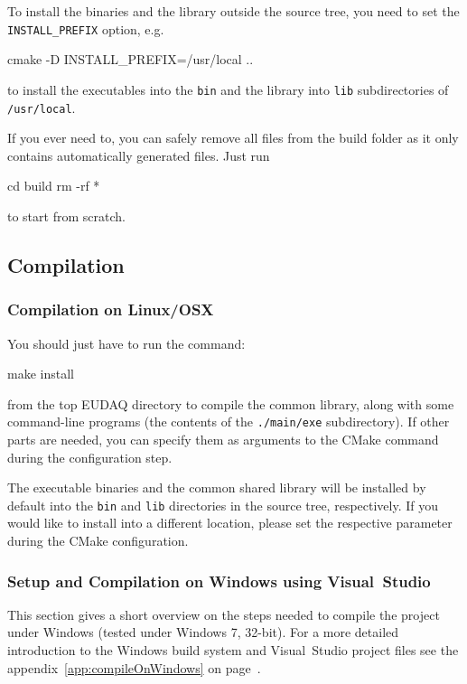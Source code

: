 To install the binaries and the library outside the source tree, you
need to set the \texttt{INSTALL\_PREFIX} option, e.g.
\begin{listing}[mybash]
cmake -D INSTALL_PREFIX=/usr/local ..
\end{listing}
to install the executables into the \texttt{bin} and the library into \texttt{lib} subdirectories of \texttt{/usr/local}.

If you ever need to, you can safely remove all files from the build folder
as it only contains automatically generated files. Just run
\begin{listing}[mybash]
cd build
rm -rf *
\end{listing}
to start from scratch.


\subsection{Compilation}

\subsubsection{Compilation on Linux/OSX}
You should just have to run the command:
\begin{listing}[mybash]
make install
\end{listing}

from the top EUDAQ directory to compile the common library,
along with some command-line programs (the contents of the \texttt{./main/exe} subdirectory).
If other parts are needed, you can specify them as arguments to the
CMake command during the configuration step.

The executable binaries and the common shared library will be installed by default into the
\texttt{bin} and \texttt{lib} directories in the source tree,
respectively. If you would like to install into a different location,
please set the respective parameter during the CMake configuration.

\subsubsection{Setup and Compilation on Windows using Visual~Studio}

This section gives a short overview on the steps needed to compile the
project under Windows (tested under Windows 7, 32-bit). For a more
detailed introduction to the Windows build system and Visual~Studio
project files see the appendix~\ref{app:compileOnWindows} on
page~\pageref{app:compileOnWindows}.


